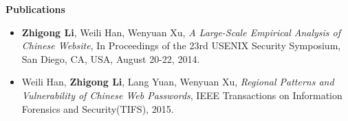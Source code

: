 \documentclass[letterpaper,10pt]{article}
\newcommand{\resheading}[1]{{\large \colorbox{mygrey}{\begin{minipage}{\textwidth}{\textbf{#1 \vphantom{p\^{E}}}}\end{minipage}}}}
\begin{document}








\resheading{Publications}
\begin{itemize}
 \item 
 \textbf{Zhigong Li}, Weili Han, Wenyuan Xu, \emph{A Large-Scale Empirical Analysis of Chinese Website}, In Proceedings of the 23rd {USENIX} Security Symposium, San Diego, CA, USA, August 20-22, 2014.
 \item Weili Han, \textbf{Zhigong Li}, Lang Yuan, Wenyuan Xu, \emph{Regional Patterns and Vulnerability of Chinese Web Passwords}, IEEE Transactions on Information Forensics and Security(TIFS), 2015.
\end{itemize}
\end{document}
